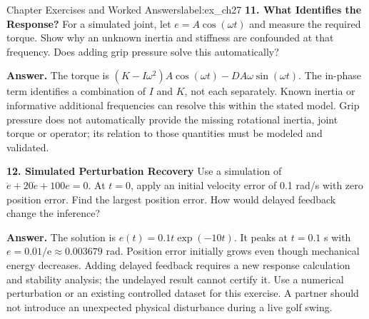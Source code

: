 \begin{exercises}{Chapter Exercises and Worked Answers}{label:ex_ch27}
\textbf{11. What Identifies the Response?}
\label{ex:grip_pressure}
For a simulated joint, let $e=A\cos(\omega t)$ and measure the required torque. Show why an unknown inertia and stiffness are confounded at that frequency. Does adding grip pressure solve this automatically?

\textbf{Answer.} The torque is $(K-I\omega^2)A\cos(\omega t)-DA\omega\sin(\omega t)$. The in-phase term identifies a combination of $I$ and $K$, not each separately. Known inertia or informative additional frequencies can resolve this within the stated model. Grip pressure does not automatically provide the missing rotational inertia, joint torque or operator; its relation to those quantities must be modeled and validated.

\textbf{12. Simulated Perturbation Recovery}
\label{ex:perturbation_recovery}
Use a simulation of $\ddot e+20\dot e+100e=0$. At $t=0$, apply an initial velocity error of 0.1 rad/s with zero position error. Find the largest position error. How would delayed feedback change the inference?

\textbf{Answer.} The solution is $e(t)=0.1t\exp(-10t)$. It peaks at $t=0.1$ s with $e=0.01/\mathrm e\approx0.003679$ rad. Position error initially grows even though mechanical energy decreases. Adding delayed feedback requires a new response calculation and stability analysis; the undelayed result cannot certify it. Use a numerical perturbation or an existing controlled dataset for this exercise. A partner should not introduce an unexpected physical disturbance during a live golf swing.

\end{exercises}
\clearpage
\flushbottom{}
